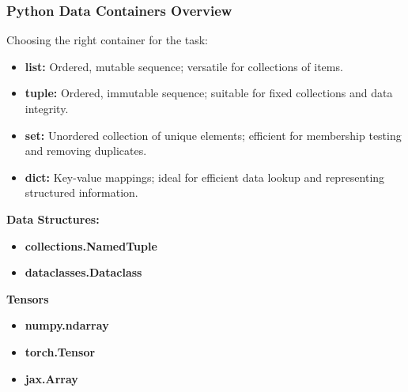 \subsubsection{Python Data Containers Overview}
\begin{definition}
    Choosing the right container for the task:
    \begin{itemize}
        \item \textbf{list:} Ordered, mutable sequence; versatile for collections of items.
        \item \textbf{tuple:} Ordered, immutable sequence; suitable for fixed collections and data integrity.
        \item \textbf{set:} Unordered collection of unique elements; efficient for membership testing and removing duplicates.
        \item \textbf{dict:} Key-value mappings; ideal for efficient data lookup and representing structured information.
    \end{itemize}
    \vspace{1em}
    
    \textbf{Data Structures:}
    \begin{itemize}
        \item \textbf{collections.NamedTuple}
        \item \textbf{dataclasses.Dataclass}
    \end{itemize}
    \vspace{1em}

    \textbf{Tensors}
    \begin{itemize}
        \item \textbf{numpy.ndarray}
        \item \textbf{torch.Tensor}
        \item \textbf{jax.Array}
    \end{itemize}
\end{definition}


